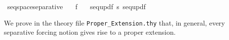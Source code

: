 \begin{isabelle}
\isamarkupfalse%
\ seqspace{\isacharunderscore}separative{\isacharcolon}\isanewline
\ \ \ {\isachardoublequoteopen}f{\isasymin}{}{\isacharcircum}{\isacharless}{\isasymomega}{\isachardoublequoteclose}\isanewline
\ \ \ {\isachardoublequoteopen}seq{\isacharunderscore}upd{\isacharparenleft}f{\isacharcomma}{}{\isacharparenright}\ {\isasymbottom}s\ seq{\isacharunderscore}upd{\isacharparenleft}f{\isacharcomma}{}{\isacharparenright}{\isachardoublequoteclose}
\end{isabelle}
 
We prove in the theory file \verb|Proper_Extension.thy| that, in
general, every separative forcing notion gives rise to a proper
extension.

